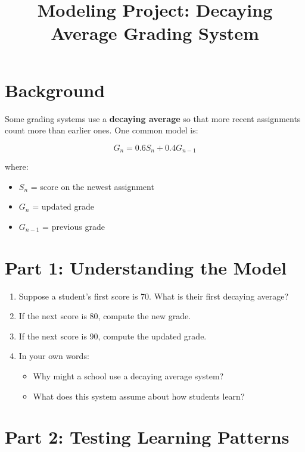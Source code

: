 \documentclass[12pt]{article}
\title{Modeling Project: Decaying Average Grading System}
\author{}
\date{}
\begin{document}
\maketitle

\section*{Background}

Some grading systems use a \textbf{decaying average} so that more recent assignments count more than earlier ones. One common model is:

\[
G_n = 0.6 S_n + 0.4 G_{n-1}
\]

where:
\begin{itemize}
    \item $S_n$ = score on the newest assignment
    \item $G_n$ = updated grade
    \item $G_{n-1}$ = previous grade
\end{itemize}

\section*{Part 1: Understanding the Model}

\begin{enumerate}
    \item Suppose a student's first score is 70. What is their first decaying average?
    \vspace{1.5cm}
    
    \item If the next score is 80, compute the new grade.
    \vspace{1.5cm}
    
    \item If the next score is 90, compute the updated grade.
    \vspace{1.5cm}
    
    \item In your own words:
    \begin{itemize}
        \item Why might a school use a decaying average system?
        \item What does this system assume about how students learn?
    \end{itemize}
    \vspace{2cm}
\end{enumerate}

\section*{Part 2: Testing Learning Patterns}
\end{document}
